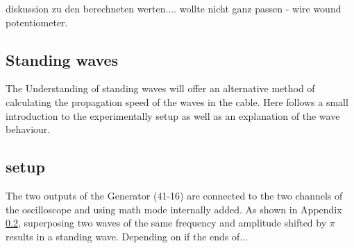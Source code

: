 \documentclass[a4paper,10pt,twocolumn]{article}
\begin{document}
    diskussion zu den berechneten werten.... wollte nicht ganz passen - wire wound potentiometer.
    
    \subsection{Standing waves}
    The Understanding of standing waves will offer an alternative method of  calculating the propagation speed of the waves in the cable.
    Here follows a small introduction to the experimentally setup as well as an explanation of the wave behaviour.
    \subsection{setup}
    The two outputs of the Generator (41-16) are connected to the two channels of the oscilloscope and using math mode internally added.
    As shown in Appendix \ref{}, superposing two waves of the same frequency and amplitude shifted by $\pi$ results in a standing wave.
    Depending on if the ends of...
    
    
\end{document}

